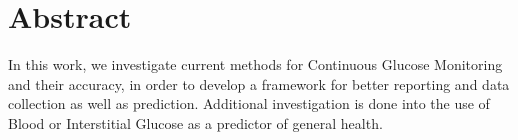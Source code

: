 %
\chapter*{Abstract}
\label{sec:abstract}
\vspace*{-10mm}

In this work, we investigate current methods for Continuous Glucose Monitoring and their accuracy, in order to develop a framework for better reporting and data collection as well as prediction. Additional investigation is done into the use of Blood or Interstitial Glucose as a predictor of general health.

\vspace*{20mm}